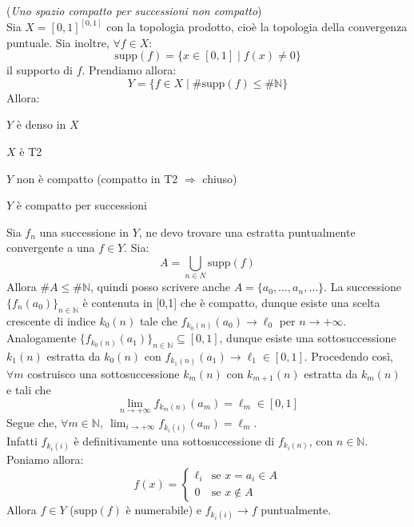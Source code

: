 \begin{ex}(\emph{Uno spazio compatto per successioni non compatto})\\
Sia $X=[0,1]^{[0,1]}$ con la topologia prodotto, cioè la topologia della convergenza puntuale. Sia inoltre, $\forall f \in X$:
$$\text{supp}(f)=\{x \in [0,1] \mid f(x) \neq 0\}$$
il supporto di $f$. Prendiamo allora:
$$Y=\{f \in X \mid \#\text{supp}(f) \le \#\mathbb{N}\}$$
Allora:
\begin{nlist}
\item $Y$ è denso in $X$
\item $X$ è T2
\item $Y$ non è compatto (compatto in T2 $\Rightarrow$ chiuso)
\item $Y$ è compatto per successioni
\end{nlist}
Sia $f_n$ una successione in $Y$, ne devo trovare una estratta puntualmente convergente a una $f \in Y$. Sia:
$$A=\bigcup _{n \in N} \text{supp}(f)$$
Allora $\#A \le \#\mathbb{N}$, quindi posso scrivere anche $A=\{a_0,\dots,a_n,\dots\}$. La successione $\{f_n(a_0)\}_{n \in \mathbb{N}}$ è contenuta in [0,1] che è compatto, dunque esiste una scelta crescente di indice $k_0(n)$ tale che $f_{k_0(n)} (a_0) \longrightarrow \ell _0$ per $n \longrightarrow +\infty$.\\
Analogamente $\{f_{k_0(n)}(a_1)\}_{n \in \mathbb{N}} \subseteq [0,1]$, dunque esiste una sottosuccessione $k_1(n)$ estratta da $k_0(n)$ con $f_{k_1(n)}(a_1) \longrightarrow \ell _1 \in [0,1]$. Procedendo così, $\forall m$ costruisco una sottosuccessione $k_m(n)$ con $k_{m+1}(n)$ estratta da $k_m(n)$ e tali che
$$\lim _{n \rightarrow +\infty} f_{k_m(n)}(a_m)=\ell _m \in [0,1]$$
Segue che, $\forall m \in \mathbb{N},\ \displaystyle \lim _{i \rightarrow +\infty} f_{k_i(i)} (a_m)=\ell _m$.\\
Infatti $f_{k_i(i)}$ è definitivamente una sottosuccessione di $f_{k_i(n)}$, con $n \in \mathbb{N}$. Poniamo allora:
$$f(x)=\begin{cases} \ell _i & \mbox{se }x=a_i \in A \\ 0 & \mbox{se }x \notin A \end{cases}$$
Allora $f \in Y$ ($\text{supp}(f)$ è numerabile) e $f_{k_i(i)} \longrightarrow f$ puntualmente.
\end{ex}